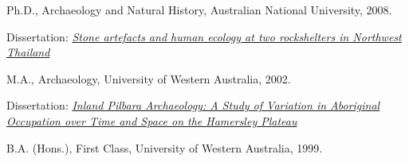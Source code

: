 
\ind Ph.D., Archaeology and Natural History, Australian National University, 2008.

 \vspace{0.05in}
\begin{Spacing}{0.75}
\ind \hspace{0.35in} 
\footnotesize {Dissertation: \emph{\href{http://dx.doi.org/10.6084/m9.figshare.765252}{Stone artefacts and human ecology at two rockshelters in Northwest Thailand}}} \normalsize \vspace{0.05in}
 \end{Spacing}

\ind M.A., Archaeology, University of Western Australia, 2002. 

\vspace{0.05in}
\begin{Spacing}{0.75} 
\ind \hspace{0.35in} \footnotesize Dissertation: \emph{\href{http://dx.doi.org/10.6084/m9.figshare.765251}{ Inland Pilbara Archaeology: A Study of Variation in Aboriginal Occupation over Time and Space on the Hamersley Plateau}} \normalsize \vspace{0.05in}
 \end{Spacing}

\ind B.A. (Hons.), First Class, University of Western Australia, 1999.
